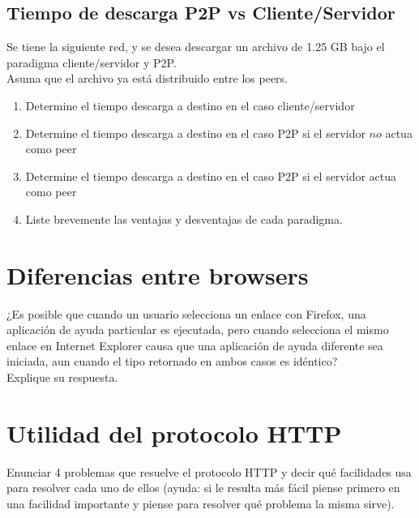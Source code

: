 \documentclass[12pt]{report}
\begin{document}
\begin{exer}
	\section{Tiempo de descarga P2P vs Cliente/Servidor \sfour}

	Se tiene la siguiente red, y se desea descargar un archivo de 1.25 GB bajo el paradigma cliente/servidor y P2P. \\ Asuma que el archivo ya está distribuido entre los peers.


	\begin{enumerate}
		\item Determine el tiempo descarga a destino en el caso cliente/servidor
		\item Determine el tiempo descarga a destino en el caso P2P si el servidor $no$ actua como peer
		\item Determine el tiempo descarga a destino en el caso P2P si el servidor actua como peer
		\item Liste brevemente las ventajas y desventajas de cada paradigma.
	\end{enumerate}


\end{exer}

\section{Diferencias entre browsers \sone \steo}

¿Es posible que cuando un usuario selecciona un enlace con Firefox, una aplicación de ayuda particular es ejecutada, pero cuando selecciona el mismo enlace en Internet Explorer causa que una aplicación de ayuda diferente sea iniciada, aun cuando el tipo  retornado en ambos casos es
idéntico?\\ Explique su respuesta.

\section{Utilidad del protocolo HTTP \stwo \steo}

Enunciar 4 problemas que resuelve el protocolo HTTP y decir qué facilidades usa
para resolver cada uno de ellos (ayuda: si le resulta más fácil piense primero en una facilidad
importante y piense para resolver qué problema la misma sirve).
\end{document}
